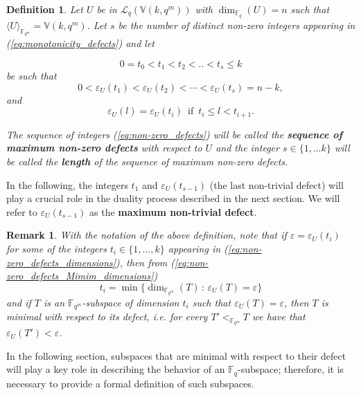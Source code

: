 \documentclass[11pt]{amsart}
\newtheorem{definition}[theorem]{Definition}
\newtheorem{remark}[theorem]{Remark}
\newcommand{\fqm}{\mathbb{F}_{q^m}}
\newcommand{\F}{{\mathbb F}}
\newcommand{\fq}{{\mathbb F}_{q}}
\begin{document}
\begin{definition} \label{def:non-zero max defects}
    Let $U$ be in $\mathcal{L}_q(\mathbb{V}(k,q^m))$ with $\dim_{\fq}(U)=n$ such that $\langle U\rangle_{\fqm}=\mathbb{V}(k,q^m)$. Let $s$ be the number of distinct non-zero integers appearing in (\ref{eq:monotonicity_defects}) and let 
    
    \begin{equation} \label{eq:non-zero_defects_dimensions}
    0=t_0<t_1<t_2<..<t_s\leq k
   \end{equation}
be such that
     \begin{equation} \label{eq:non-zero_defects}
   0<  \varepsilon_U(t_1) < \varepsilon_U(t_2)< \cdots < \varepsilon_U(t_s)=n-k,
\end{equation}
and 
\begin{equation} \label{eq:non-zero_defects_Mimim_dimensions}
    \varepsilon_U(l)=\varepsilon_U(t_{i}) \,\,\, \mbox{if} \, \,\,  t_i\leq l<t_{i+1}.
   \end{equation}



The sequence of integers (\ref{eq:non-zero_defects}) will be called the {\bf sequence of maximum non-zero defects} with respect to $U$ and the integer $s \in \{1,\dots k\}$ will be called the {\bf length} of the  sequence of maximum non-zero defects.
\end{definition}

In the following, the integers $t_1$ and $\varepsilon_{U}(t_{s-1})$ (the last non-trivial defect) will play a crucial role in the duality process  described in the next section. We will refer to $\varepsilon_{U}(t_{s-1})$ as the \textbf{maximum non-trivial defect}.

\begin{remark} \label{rem: t_i minimum dimension}
With the notation of the above definition, note that if $\varepsilon=\varepsilon_U(t_i)$ for some of the integers $t_i\in \{1,\dots,k\}$ appearing in (\ref{eq:non-zero_defects_dimensions}), then from (\ref{eq:non-zero_defects_Mimim_dimensions})
\[t_i=\min\{\dim_{\fqm} (T) \,:\, \varepsilon_U(T)=\varepsilon\}\]
and if $T$ is an $\F_{q^m}$-subspace of dimension $t_i$ such that $\varepsilon_U(T)=\varepsilon$, then  $T$ is minimal with respect to its defect, i.e. for every $T' <_{\fqm} T$ we have that $\varepsilon_{U}(T')< \varepsilon$.
\end{remark}

In the following section, subspaces that are minimal with respect to their defect will play a key role in describing the behavior of an $\fq$-subspace; therefore, it is necessary to provide a formal definition of such subspaces.
\end{document}

